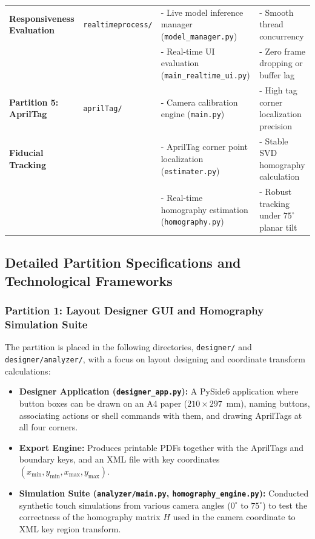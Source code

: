 \begin{table}[htbp]
{\begin{tabular}{l l l l}
\textbf{Responsiveness Evaluation} & \texttt{realtimeprocess/} & - Live model inference manager (\texttt{model\_manager.py}) & - Smooth thread concurrency \\
 & & - Real-time UI evaluation (\texttt{main\_realtime\_ui.py}) & - Zero frame dropping or buffer lag \\
\midrule
\textbf{Partition 5: AprilTag} & \texttt{aprilTag/} & - Camera calibration engine (\texttt{main.py}) & - High tag corner localization precision \\
\textbf{Fiducial Tracking} & & - AprilTag corner point localization (\texttt{estimater.py}) & - Stable SVD homography calculation \\
 & & - Real-time homography estimation (\texttt{homography.py}) & - Robust tracking under $75^\circ$ planar tilt \\
\bottomrule
\end{tabular}%
}
\end{table}

\subsection{Detailed Partition Specifications and Technological Frameworks}
\label{subsec:meth_partition_details}

\subsubsection{Partition 1: Layout Designer GUI and Homography Simulation Suite}
The partition is placed in the following directories, \texttt{designer/} and \texttt{designer/analyzer/}, with a focus on layout designing and coordinate transform calculations:
\begin{itemize}
    \item \textbf{Designer Application (\texttt{designer\_app.py}):} A PySide6 application where button boxes can be drawn on an A4 paper ($210 \times 297$~mm), naming buttons, associating actions or shell commands with them, and drawing AprilTags at all four corners.
    \item \textbf{Export Engine:} Produces printable PDFs together with the AprilTags and boundary keys, and an XML file with key coordinates $(x_{\min}, y_{\min}, x_{\max}, y_{\max})$.
    \item \textbf{Simulation Suite (\texttt{analyzer/main.py}, \texttt{homography\_engine.py}):} Conducted synthetic touch simulations from various camera angles ($0^\circ$ to $75^\circ$) to test the correctness of the homography matrix $H$ used in the camera coordinate to XML key region transform.
\end{itemize}

